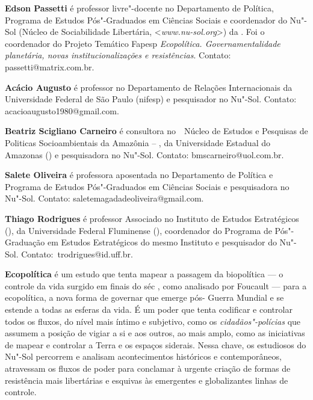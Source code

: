 \textbf{Edson Passetti} é professor livre"-docente no Departamento de Política, Programa de Estudos Pós"-Graduados em Ciências Sociais e coordenador do Nu"-Sol (Núcleo de Sociabilidade Libertária, \textless{}\emph{www.nu-sol.org}\textgreater{}) da . Foi o coordenador do Projeto Temático Fapesp \emph{Ecopolítica. Governamentalidade planetária, novas institucionalizações e resistências}. Contato: passetti@matrix.com.br.

\textbf{Acácio Augusto} é professor no Departamento de Relações Internacionais da Universidade Federal de São Paulo (nifesp) e pesquisador no Nu"-Sol. Contato: acacioaugusto1980@gmail.com.

\textbf{Beatriz Scigliano Carneiro} é consultora no  Núcleo de Estudos e Pesquisas de Politicas Socioambientais da Amazônia -- , da Universidade Estadual do Amazonas () e pesquisadora no Nu"-Sol. Contato: bmscarneiro@uol.com.br.

\textbf{Salete Oliveira} é professora aposentada no Departamento de Política e Programa de Estudos Pós"-Graduados em Ciências Sociais e pesquisadora no Nu"-Sol. Contato: saletemagadadeoliveira@gmail.com.

\textbf{Thiago Rodrigues} é professor Associado no Instituto de Estudos Estratégicos (), da Universidade Federal Fluminense (), coordenador do Programa de Pós"-Graduação em Estudos Estratégicos do mesmo Instituto e pesquisador do Nu"-Sol. Contato: trodrigues@id.uff.br.

\textbf{Ecopolítica} é um estudo que tenta mapear a passagem da biopolítica --- o controle da vida surgido em finais do séc , como analisado por Foucault --- para a ecopolítica, a nova forma de governar que emerge pós- Guerra Mundial e se estende a todas as esferas da vida. É um poder que tenta codificar e controlar todos os fluxos,  do nível mais íntimo e subjetivo, como os \emph{cidadãos"-polícias} que assumem a posição de vigiar a si e aos outros, ao mais amplo, como as iniciativas de mapear e controlar a Terra e os espaços siderais. Nessa chave, os estudiosos do Nu"-Sol percorrem e analisam acontecimentos históricos e contemporâneos, atravessam os fluxos de poder para conclamar à urgente criação de formas de resistência mais libertárias e esquivas às emergentes e globalizantes linhas de controle.





